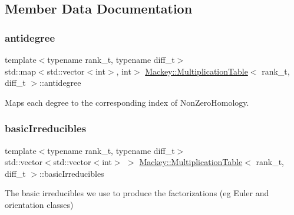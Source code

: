 \subsection{Member Data Documentation}
\mbox{\label{classMackey_1_1MultiplicationTable_ac5749155e5531a3c728d8227caed63eb}} 
\subsubsection{\texorpdfstring{antidegree}{antidegree}}
{\footnotesize\ttfamily template$<$typename rank\+\_\+t, typename diff\+\_\+t$>$ \\
std\+::map$<$std\+::vector$<$int$>$, int$>$ \hyperlink{classMackey_1_1MultiplicationTable}{Mackey\+::\+Multiplication\+Table}$<$ rank\+\_\+t, diff\+\_\+t $>$\+::antidegree\hspace{0.3cm}{\ttfamily [protected]}}



Maps each degree to the corresponding index of Non\+Zero\+Homology. 

\mbox{\label{classMackey_1_1MultiplicationTable_af6896ea01c087e71533de423d7cf65ac}} 
\subsubsection{\texorpdfstring{basic\+Irreducibles}{basicIrreducibles}}
{\footnotesize\ttfamily template$<$typename rank\+\_\+t, typename diff\+\_\+t$>$ \\
std\+::vector$<$std\+::vector$<$int$>$ $>$ \hyperlink{classMackey_1_1MultiplicationTable}{Mackey\+::\+Multiplication\+Table}$<$ rank\+\_\+t, diff\+\_\+t $>$\+::basic\+Irreducibles\hspace{0.3cm}{\ttfamily [protected]}}



The basic irreducibles we use to produce the factorizations (eg Euler and orientation classes) 

\mbox{\label{classMackey_1_1MultiplicationTable_a9a0d2a2d8561e378e08fcf4929df2cf6}} 

